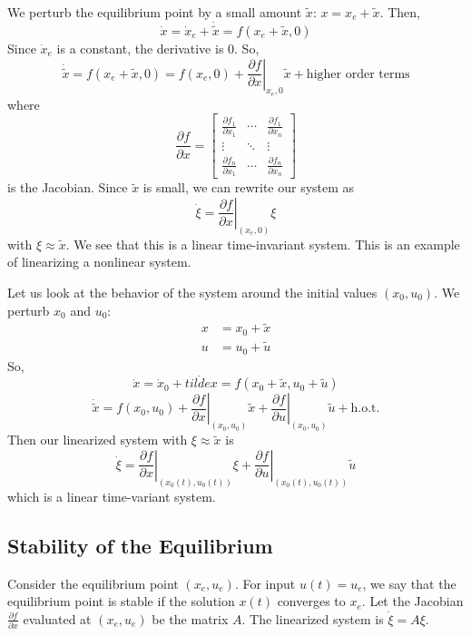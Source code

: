 \documentclass{article}
\begin{document}
\noindent
We perturb the equilibrium point by a small amount $\tilde{x}$: $x = x_e + \tilde{x}$. Then,
\[\dot{x} = \dot{x}_e + \dot{\tilde{x}} = f(x_e + \tilde{x}, 0)\]
Since $\dot{x}_e$ is a constant, the derivative is 0. So,
\[\dot{\tilde{x}} = f(x_e + \tilde{x}, 0) = f(x_e, 0) +
\left.\frac{\partial f}{\partial x}\right|_{x_e, 0}\tilde{x} + \text{higher order terms}\]
where
\[\frac{\partial f}{\partial x} = \left[\begin{matrix}
    \frac{\partial f_1}{\partial x_1} & \cdots & \frac{\partial f_1}{\partial x_n} \\[2mm]
    \vdots & \ddots & \vdots \\[2mm]
    \frac{\partial f_n}{\partial x_1} & \cdots & \frac{\partial f_n}{\partial x_n}
\end{matrix}\right]\]
is the Jacobian. Since $\tilde{x}$ is small, we can rewrite our system as
\[\dot{\xi} = \left.\frac{\partial f}{\partial x}\right|_{(x_e, 0)}\xi\]
with $\xi \approx \tilde{x}$. We see that this is a linear time-invariant system. This is an example
of linearizing a nonlinear system.

\noindent
Let us look at the behavior of the system around the initial values $(x_0, u_0)$.
We perturb $x_0$ and $u_0$:
\begin{align*}
    x &= x_0 + \tilde{x} \\
    u &= u_0 + \tilde{u}
\end{align*}
So,
\[\dot{x} = \dot{x}_0 + \dot{tilde{x}} = f(x_0 + \tilde{x}, u_0 + \tilde{u})\]
\[\dot{\tilde{x}} = f(x_0, u_0) + \left.\frac{\partial f}{\partial x}\right|_{(x_0, u_0)}\tilde{x}
+ \left.\frac{\partial f}{\partial u}\right|_{(x_0, u_0)}\tilde{u} + \text{h.o.t.}\]
Then our linearized system with $\xi \approx \tilde{x}$ is
\[\dot{\xi} = \left.\frac{\partial f}{\partial x}\right|_{(x_0(t), u_0(t))}\xi
+ \left.\frac{\partial f}{\partial u}\right|_{(x_0(t), u_0(t))}\tilde{u}\]
which is a linear time-variant system.

\subsection{Stability of the Equilibrium}

Consider the equilibrium point $(x_e, u_e)$. For input $u(t) = u_e$, we say that
the equilibrium point is stable if the solution $x(t)$ converges to $x_e$. Let the Jacobian
$\frac{\partial f}{\partial x}$ evaluated at $(x_e, u_e)$ be the matrix $A$. The linearized system
is $\dot{\xi} = A\xi$.
\end{document}
